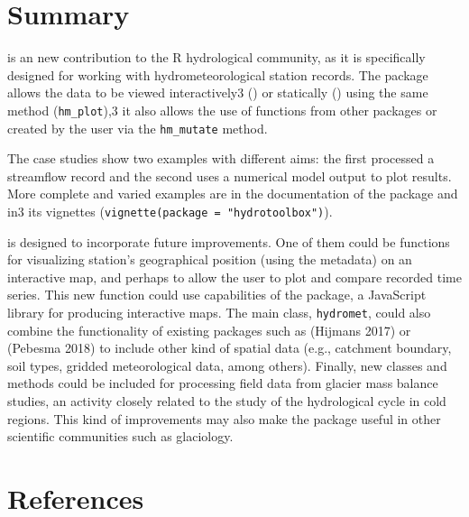 \hypertarget{summary}{%
\section{Summary}\label{summary}}

 is an new contribution to the R hydrological community,
as it is specifically designed for working with hydrometeorological
station records. The package allows the data to be viewed
interactively3 () or statically () using the same method
(\texttt{hm\_plot}),3 it also allows the use of functions from other packages or
created by the user via the \texttt{hm\_mutate} method.

The case studies show two examples with different aims: the first processed
a streamflow record and the second uses a numerical model output to
plot results. More complete and varied examples are in the documentation of the
package and in3 its vignettes (\texttt{vignette(package\ =\ "hydrotoolbox")}).

 is designed to incorporate future improvements. One of them
could be functions for visualizing station's geographical position
(using the metadata) on an
interactive map, and perhaps to allow the user to plot and compare recorded
time series. This new function could use capabilities of the
 package, a JavaScript library for producing interactive maps.
The main class, \texttt{hydromet}, could also combine the functionality of
existing packages such as  (Hijmans 2017) or 
(Pebesma 2018) to include other kind of spatial data (e.g., catchment
boundary, soil types, gridded meteorological data, among others).
Finally, new classes and methods could be included for processing field data
from glacier mass balance studies, an activity closely related to the study
of the hydrological cycle in cold regions. This kind of improvements may
also make the package useful in other scientific communities such as glaciology.

\hypertarget{references}{%
\section*{References}\label{references}}

